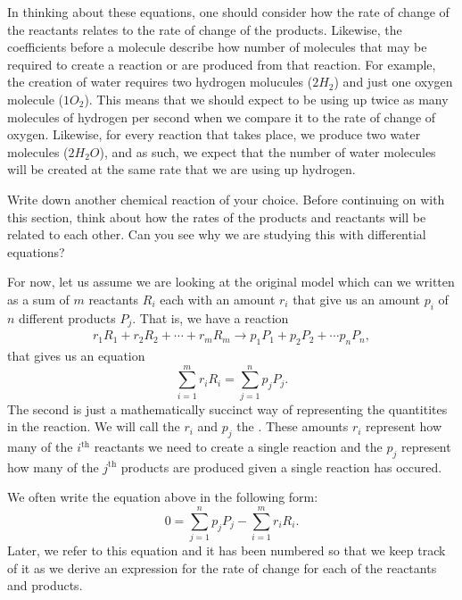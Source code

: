         In thinking about these equations, one should consider how the rate of change of the reactants relates to the rate of change of the products.  Likewise, the coefficients before a molecule describe how number of molecules that may be required to create a reaction or are produced from that reaction.  For example, the creation of water requires two hydrogen molucules ($2H_2$) and just one oxygen molecule ($1O_2$).  This means that we should expect to be using up twice as many molecules of hydrogen per second when we compare it to the rate of change of oxygen.  Likewise, for every reaction that takes place, we produce two water molecules ($2H_2O$), and as such, we expect that the number of water molecules will be created at the same rate that we are using up hydrogen.

        \begin{question}
            Write down another chemical reaction of your choice.  Before continuing on with this section, think about how the rates of the products and reactants will be related to each other. Can you see why we are studying this with differential equations?
        \end{question}
        
        For now, let us assume we are looking at the original model which can we written as a sum of $m$ reactants $R_i$ each with an amount $r_i$ that give us an amount $p_i$ of $n$ different products $P_j$. That is, we have a reaction
        \begin{align*}
            r_1R_1 + r_2R_2 + \cdots + r_mR_m \to p_1 P_1 + p_2P_2 +\cdots p_n P_n,
        \end{align*}
        that gives us an equation
        \[
        \sum_{i=1}^m r_iR_i = \sum_{j=1}^n p_jP_j.
        \]
        The second is just a mathematically succinct way of representing the quantitites in the reaction. We will call the $r_i$ and $p_j$ the .  These amounts $r_i$ represent how many of the $i^\textrm{th}$ reactants we need to create a single reaction and the $p_j$ represent how many of the $j^\textrm{th}$ products are produced given a single reaction has occured. 

        We often write the equation above in the following form:
        \begin{equation}
        0=\sum_{j=1}^n p_j P_j - \sum_{i=1}^m r_iR_i. \label{eq:stoich}
        \end{equation}
        Later, we refer to this equation and it has been numbered so that we keep track of it as we derive an expression for the rate of change for each of the reactants and products.
        
